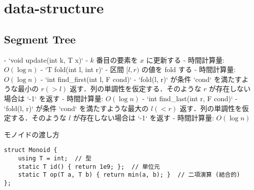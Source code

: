 \section{data-structure}

\subsection{Segment Tree}

\begin{small}
\begin{markdown}
- `void update(int k, T x)`
    - $k$ 番目の要素を $x$ に更新する
    - 時間計算量: $O(\log n)$
- `T fold(int l, int r)`
    - 区間 $[l, r)$ の値を fold する
    - 時間計算量: $O(\log n)$
- `int find\_first(int l, F cond)`
    - `fold(l, r)` が条件 `cond` を満たすような最小の $r (> l)$ 返す．列の単調性を仮定する．そのような $r$ が存在しない場合は `-1` を返す
    - 時間計算量: $O(\log n)$
- `int find\_last(int r, F cond)`
    - `fold(l, r)` が条件 `cond` を満たすような最大の $l (< r)$ 返す．列の単調性を仮定する．そのような $l$ が存在しない場合は `-1` を返す
    - 時間計算量: $O(\log n)$

\end{markdown}

モノイドの渡し方

\begin{lstlisting}
struct Monoid {
    using T = int;  // 型
    static T id() { return 1e9; };  // 単位元
    static T op(T a, T b) { return min(a, b); }  // 二項演算 (結合的)
};
\end{lstlisting}

\end{small}

